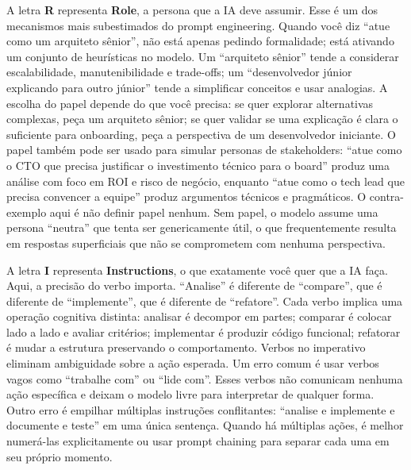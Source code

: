 A letra \textbf{R} representa \textbf{Role}, a persona que a IA deve assumir. Esse
é um dos mecanismos mais subestimados do prompt engineering. Quando você diz ``atue
como um arquiteto sênior'', não está apenas pedindo formalidade; está ativando
um conjunto de heurísticas no modelo. Um ``arquiteto sênior'' tende a considerar
escalabilidade, manutenibilidade e trade-offs; um ``desenvolvedor júnior
explicando para outro júnior'' tende a simplificar conceitos e usar analogias. A
escolha do papel depende do que você precisa: se quer explorar alternativas
complexas, peça um arquiteto sênior; se quer validar se uma explicação é clara o
suficiente para onboarding, peça a perspectiva de um desenvolvedor iniciante.
O papel também pode ser usado para simular personas de stakeholders: ``atue como o
CTO que precisa justificar o investimento técnico para o board'' produz uma análise
com foco em ROI e risco de negócio, enquanto ``atue como o tech lead que precisa
convencer a equipe'' produz argumentos técnicos e pragmáticos. O contra-exemplo
aqui é não definir papel nenhum. Sem papel, o modelo assume uma persona ``neutra''
que tenta ser genericamente útil, o que frequentemente resulta em respostas
superficiais que não se comprometem com nenhuma perspectiva.

A letra \textbf{I} representa \textbf{Instructions}, o que exatamente você quer
que a IA faça. Aqui, a precisão do verbo importa. ``Analise'' é diferente de
``compare'', que é diferente de ``implemente'', que é diferente de ``refatore''.
Cada verbo implica uma operação cognitiva distinta: analisar é decompor em partes;
comparar é colocar lado a lado e avaliar critérios; implementar é produzir código
funcional; refatorar é mudar a estrutura preservando o comportamento. Verbos no
imperativo eliminam ambiguidade sobre a ação esperada. Um erro comum é usar verbos
vagos como ``trabalhe com'' ou ``lide com''. Esses verbos não comunicam
nenhuma ação específica e deixam o modelo livre para interpretar de qualquer
forma. Outro erro é empilhar múltiplas instruções conflitantes: ``analise e
implemente e documente e teste'' em uma única sentença. Quando há múltiplas ações,
é melhor numerá-las explicitamente ou usar prompt chaining para separar cada uma
em seu próprio momento.

